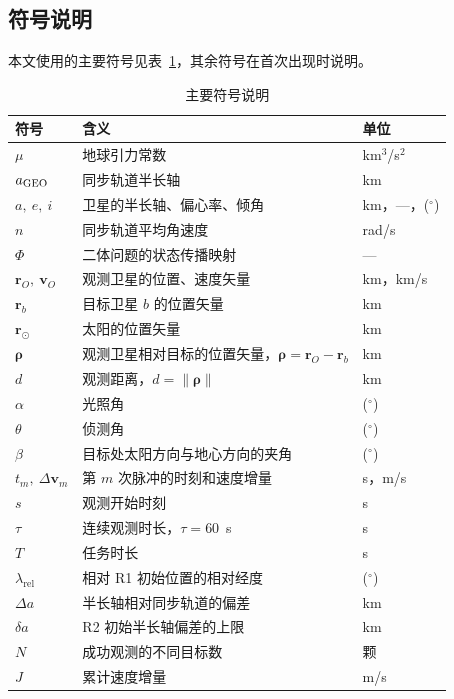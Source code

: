 \subsection{符号说明}

本文使用的主要符号见表~\ref{tab:symbols}，其余符号在首次出现时说明。

\begin{table}[!htb]
  \centering
  \caption{主要符号说明}
  \label{tab:symbols}
  \begin{tabular}{lll}
    \toprule
    符号 & 含义 & 单位 \\
    \midrule
    $\mu$ & 地球引力常数 & km$^3$/s$^2$ \\
    $a_{\mathrm{GEO}}$ & 同步轨道半长轴 & km \\
    $a,\ e,\ i$ & 卫星的半长轴、偏心率、倾角 & km，—，($^\circ$) \\
    $n$ & 同步轨道平均角速度 & rad/s \\
    $\Phi$ & 二体问题的状态传播映射 & — \\
    $\bm r_O,\ \bm v_O$ & 观测卫星的位置、速度矢量 & km，km/s \\
    $\bm r_b$ & 目标卫星 $b$ 的位置矢量 & km \\
    $\bm r_\odot$ & 太阳的位置矢量 & km \\
    $\bm\rho$ & 观测卫星相对目标的位置矢量，$\bm\rho = \bm r_O - \bm r_b$ & km \\
    $d$ & 观测距离，$d = \|\bm\rho\|$ & km \\
    $\alpha$ & 光照角 & ($^\circ$) \\
    $\theta$ & 侦测角 & ($^\circ$) \\
    $\beta$ & 目标处太阳方向与地心方向的夹角 & ($^\circ$) \\
    $t_m,\ \Delta\bm v_m$ & 第 $m$ 次脉冲的时刻和速度增量 & s，m/s \\
    $s$ & 观测开始时刻 & s \\
    $\tau$ & 连续观测时长，$\tau = 60$~s & s \\
    $T$ & 任务时长 & s \\
    $\lambda_{\mathrm{rel}}$ & 相对 R1 初始位置的相对经度 & ($^\circ$) \\
    $\Delta a$ & 半长轴相对同步轨道的偏差 & km \\
    $\delta a$ & R2 初始半长轴偏差的上限 & km \\
    $N$ & 成功观测的不同目标数 & 颗 \\
    $J$ & 累计速度增量 & m/s \\
    \bottomrule
  \end{tabular}
\end{table}
